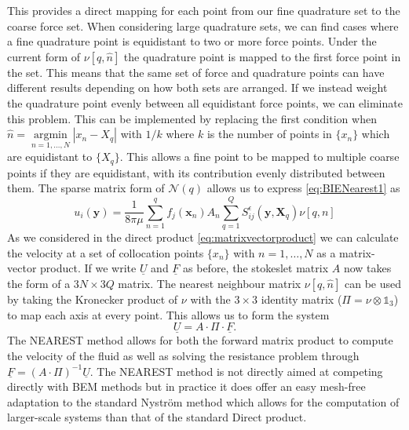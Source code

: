 This provides a direct mapping for each point from our fine quadrature set to the coarse force set. When considering large quadrature sets, we can find cases where a fine quadrature point is equidistant to two or more force points. Under the current form of $\nu [q, \hat{n}]$ the quadrature point is mapped to the first force point in the set. This means that the same set of force and quadrature points can have different results depending on how both sets are arranged. If we instead weight the quadrature point evenly between all equidistant force points, we can eliminate this problem. This can be implemented by replacing the first condition when $\hat{n}=\underset{n=1, \ldots, N}{\operatorname{argmin}}|x_n-X_q|$ with $1/k$ where $k$ is the number of points in $\{x_n\}$ which are equidistant to $\{X_q\}$. This allows a fine point to be mapped to multiple coarse points if they are equidistant, with its contribution evenly distributed between them. The sparse matrix form of $\mathcal{N}(q)$ allows us to express \cref{eq:BIENearest1} as 
\begin{equation}
    u_i(\bm{y}) = \frac{1}{8 \pi \mu} \sum_{n=1}^q  f_{j}(\bm{x}_n) A_n \sum_{q=1}^{Q}S_{i j}^{\epsilon}\left(\bm{y}, \bm{X}_q\right) \nu[q,n] 
\end{equation}
As we considered in the direct product \cref{eq:matrixvectorproduct} we can calculate the velocity at a set of collocation points $\{x_n\}$ with $n=1,\dots,N$ as a matrix-vector product. If we write $\underline{U}$ and $\underline{F}$ as before, the stokeslet matrix $A$ now takes the form of a $3N \times 3Q$ matrix. The nearest neighbour matrix $\nu [q, \hat{n}]$ can be used by taking the Kronecker product of $\nu$ with the $3 \times 3$ identity matrix ($\Pi = \nu \otimes \mathds{1}_{3}$) to map each axis at every point. This allows us to form the system
\begin{equation}
    \underline{U} = A \cdot \Pi \cdot \underline{F}.
\end{equation}
The NEAREST method allows for both the forward matrix product to compute the velocity of the fluid as well as solving the resistance problem through $\underline{F} = (A \cdot \Pi)^{-1} \underline{U}$. The NEAREST method is not directly aimed at competing directly with BEM methods but in practice it does offer an easy mesh-free adaptation to the standard Nyström method which allows for the computation of larger-scale systems than that of the standard Direct product.

